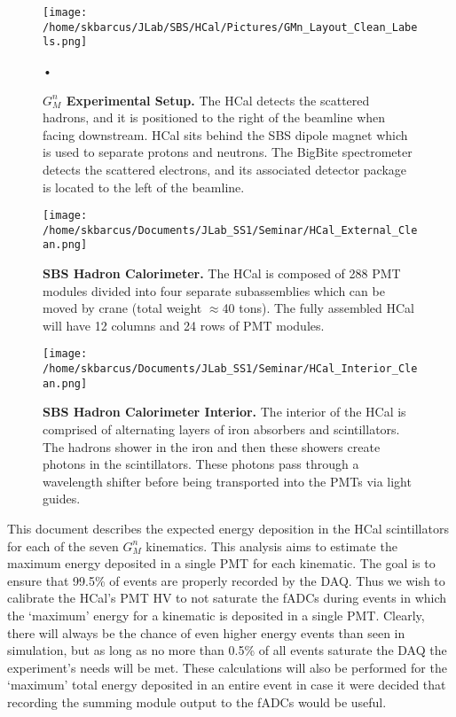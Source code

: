 \documentclass[10pt]{article}
\begin{document}
	\begin{figure}[!ht]
	\begin{center}
	\texttt{[image: /home/skbarcus/JLab/SBS/HCal/Pictures/GMn\_Layout\_Clean\_Labels.png]}
	\end{center}
	\caption{
	{\bf{$G_M^n$ Experimental Setup.}} The HCal detects the scattered hadrons, and it is positioned to the right of the beamline when facing downstream. HCal sits behind the SBS dipole magnet which is used to separate protons and neutrons. The BigBite spectrometer detects the scattered electrons, and its associated detector package is located to the left of the beamline.}
\begin{flushleft}
	•
	\end{flushleft}	\label{fig:gmn_setup}
	\end{figure}	
	
	\begin{figure}[!ht]
	\begin{center}
	\texttt{[image: /home/skbarcus/Documents/JLab\_SS1/Seminar/HCal\_External\_Clean.png]}
	\end{center}
	\caption{
	{\bf{SBS Hadron Calorimeter.}} The HCal is composed of 288 PMT modules divided into four separate subassemblies which can be moved by crane (total weight $\approx$40 tons). The fully assembled HCal will have 12 columns and 24 rows of PMT modules. }
	\label{fig:HCal}
	\end{figure}	
	
	\begin{figure}[!ht]
	\begin{center}
	\texttt{[image: /home/skbarcus/Documents/JLab\_SS1/Seminar/HCal\_Interior\_Clean.png]}
	\end{center}
	\caption{
	{\bf{SBS Hadron Calorimeter Interior.}} The interior of the HCal is comprised of alternating layers of iron absorbers and scintillators. The hadrons shower in the iron and then these showers create photons in the scintillators. These photons pass through a wavelength shifter before being transported into the PMTs via light guides.}
	\label{fig:HCal_interior}
	\end{figure}	

This document describes the expected energy deposition in the HCal scintillators for each of the seven $G_M^n$ kinematics. This analysis aims to estimate the maximum energy deposited in a single PMT for each kinematic. The goal is to ensure that 99.5\% of events are properly recorded by the DAQ. Thus we wish to calibrate the HCal's PMT HV to not saturate the fADCs during events in which the `maximum' energy for a kinematic is deposited in a single PMT. Clearly, there will always be the chance of even higher energy events than seen in simulation, but as long as no more than 0.5\% of all events saturate the DAQ the experiment's needs will be met. These calculations will also be performed for the `maximum' total energy deposited in an entire event in case it were decided that recording the summing module output to the fADCs would be useful.\\
\end{document}
